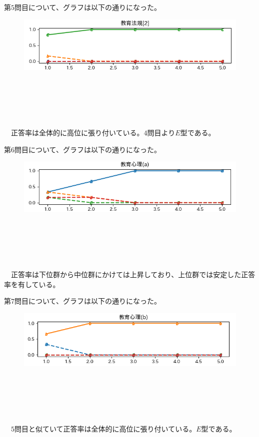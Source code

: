 \documentclass[12pt]{jarticle}
\begin{document}
第$5$問目について、グラフは以下の通りになった。
\begin{figure}[H]
  \includegraphics[bb = -7 60 1 1,scale = 1.5]{Figure_5.png}
\end{figure}
\leavevmode \\
\\
\\
\\
\\
\ \ 正答率は全体的に高位に張り付いている。$4$問目より$E$型である。

第$6$問目について、グラフは以下の通りになった。
\begin{figure}[H]
  \includegraphics[bb = -7 60 1 1,scale = 1.5]{Figure_6.png}
\end{figure}
\leavevmode \\
\\
\\
\\
\\
\ \ 正答率は下位群から中位群にかけては上昇しており、上位群では安定した正答率を有している。

第$7$問目について、グラフは以下の通りになった。
\vspace{0.5cm}
\begin{figure}[H]
  \includegraphics[bb = -7 60 1 1,scale = 1.5]{Figure_7.png}
\end{figure}
\leavevmode \\
\\
\\
\\
\\
\ \ $5$問目と似ていて正答率は全体的に高位に張り付いている。$E$型である。
\end{document}

